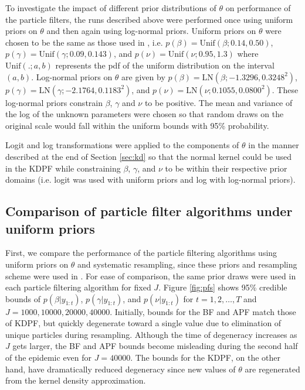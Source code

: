 \documentclass{elsarticle}
\newcommand{\danny}[1]{{\color{blue}DANNY: #1}}
\begin{document}
To investigate the impact of different prior distributions of $\theta$ on performance of the particle filters, the runs described above were performed once using uniform priors on $\theta$ and then again using log-normal priors. Uniform priors on $\theta$ were chosen to be the same as those used in \citet{skvortsov2012monitoring}, i.e. \hbox{$p(\beta) = \mbox{Unif}(\beta; 0.14, 0.50)$}, \hbox{$p(\gamma) = \mbox{Unif}(\gamma; 0.09, 0.143)$}, and \hbox{$p(\nu) = \mbox{Unif}(\nu; 0.95, 1.3)$} where $\mbox{Unif}(.; a, b)$ represents the pdf of the uniform distribution on the interval $(a,b)$. Log-normal priors on $\theta$ are given by \hbox{$p(\beta) = \mbox{LN}(\beta; -1.3296, 0.3248^2)$}, \hbox{$p(\gamma) = \mbox{LN}(\gamma; -2.1764, 0.1183^2)$}, and \hbox{$p(\nu) = \mbox{LN}(\nu; 0.1055, 0.0800^2)$}. These log-normal priors constrain $\beta$, $\gamma$ and $\nu$ to be positive. The mean and variance of the log of the unknown parameters were chosen so that random draws on the original scale would fall within the uniform bounds with 95\% probability.

Logit and log transformations were applied to the components of $\theta$ in the manner described at the end of Section \ref{sec:kd} so that the normal kernel could be used in the KDPF while constraining $\beta$, $\gamma$, and $\nu$ to be within their respective prior domains (i.e. logit was used with uniform priors and log with log-normal priors). %

\subsection{Comparison of particle filter algorithms under uniform priors} \label{sec:pfcomparison}

First, we compare the performance of the particle filtering algorithms using uniform priors on $\theta$ and systematic resampling, since these priors and resampling scheme were used in \citet{skvortsov2012monitoring}. For ease of comparison, the same prior draws were used in each particle filtering algorithm for fixed $J$. Figure \ref{fig:pfs} shows 95\% credible bounds of $p(\beta|y_{1:t})$, $p(\gamma|y_{1:t})$, and $p(\nu|y_{1:t})$ for $t = 1,2,\ldots,T$ and $J = 1000, 10000, 20000, 40000$. Initially, bounds for the BF and APF match those of KDPF, but quickly degenerate toward a single value due to elimination of unique particles during resampling. Although the time of degeneracy increases as $J$ gets larger, the BF and APF bounds become misleading during the second half of the epidemic even for $J = 40000$. The bounds for the KDPF, on the other hand, have dramatically reduced degeneracy since new values of $\theta$ are regenerated from the kernel density approximation.
\end{document}
